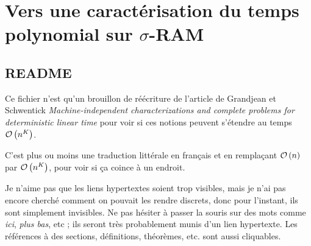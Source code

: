 %
%
%
%
%
%



\newcommand{\dtimeram}{\text{DTIME}_{\text{RAM}}\left( n^H \right)}
\newcommand{\dtimeramarg}[1]{\text{DTIME}_{\text{RAM}}\left( n^{#1} \right)}
\newcommand{\eqpred}[3]{#1\left[ #2^{\leftarrow}(#3) \right]_{#3}}
\newcommand{\eqpredf}[4]{#1\left[ #2^{\leftarrow}(#3) \right]_{#4}} %
\newcommand{\eqpredfi}[5]{#1\left[ #2^{\leftarrow}(#3) #4 \right]_{#5}} %
\newcommand{\arite}[1]{\text{arité}\left( #1 \right)}
\newcommand{\leqa}{\left( \leqslant a \right)}


%
%	
%	
%	
	\pagebreak 
	
	\chapter{Vers une caractérisation du temps polynomial sur $\sigma$-RAM}
	\label{chap:LSRS}
	
	\section*{README}
		\label{sec:README}
	
	Ce fichier n'est qu'un brouillon de réécriture de l'article de Grandjean et Schwentick \emph{Machine-independent characterizations and complete problems for deterministic linear time} pour voir si ces notions peuvent s'étendre au temps $\mathcal{O}\left( n^K \right)$.
	
	C'est plus ou moins une traduction littérale en français et en remplaçant $\mathcal{O}\left( n \right)$ par $\mathcal{O}\left( n^K \right)$, pour voir si ça coince à un endroit.
	
	Je n'aime pas que les liens hypertextes soient trop visibles, mais je n'ai pas encore cherché comment on pouvait les rendre discrets, donc pour l'instant, ils sont simplement invisibles. Ne pas hésiter à passer la souris sur des mots comme \emph{ici}, \emph{plus bas}, etc ; ils seront très probablement munis d'un lien hypertexte. Les références à des sections, définitions, théorèmes, etc. sont aussi cliquables.
	

